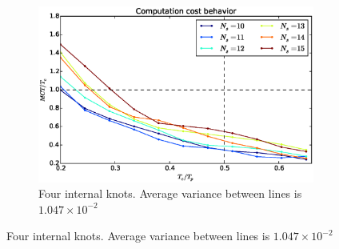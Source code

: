 \documentclass[eprint]{actapoly}
\begin{document}
\begin{figure}[!h]
        \centering
        ~ %
        \begin{subfigure}[b]{0.48\textwidth}
                \includegraphics[width=\textwidth]{./images/realtime/Scenario_3__N_knots_4/mcttc-tctp.eps}
                \caption{Four internal knots. Average variance between lines is $1.047\times 10^{-2}$}\label{fig:uni34}
        \end{subfigure}
        

\end{figure}
\end{document}
